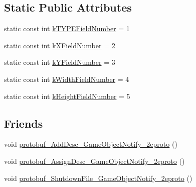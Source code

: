 \subsection*{Static Public Attributes}
\begin{DoxyCompactItemize}
\item 
static const int \hyperlink{class_game_object_notify_a1686fae6e717999f7a4a3c883336ae5d}{k\-T\-Y\-P\-E\-Field\-Number} = 1
\item 
static const int \hyperlink{class_game_object_notify_a433cdc06e51abce278f247ff3a046608}{k\-X\-Field\-Number} = 2
\item 
static const int \hyperlink{class_game_object_notify_a4750c0b42b3b9515597e0d6665245f56}{k\-Y\-Field\-Number} = 3
\item 
static const int \hyperlink{class_game_object_notify_a5462ed3aee65d02ae60fe9a2de05a849}{k\-Width\-Field\-Number} = 4
\item 
static const int \hyperlink{class_game_object_notify_a15142be03ab21831b8f54cd346a409a2}{k\-Height\-Field\-Number} = 5
\end{DoxyCompactItemize}
\subsection*{Friends}
\begin{DoxyCompactItemize}
\item 
void \hyperlink{class_game_object_notify_ad39fab9cb60a70367567c18bd3667614}{protobuf\-\_\-\-Add\-Desc\-\_\-\-Game\-Object\-Notify\-\_\-2eproto} ()
\item 
void \hyperlink{class_game_object_notify_abfcb28a9131368bf7de1e6967278aeb4}{protobuf\-\_\-\-Assign\-Desc\-\_\-\-Game\-Object\-Notify\-\_\-2eproto} ()
\item 
void \hyperlink{class_game_object_notify_a849952bd288bb23b66755e3f6fb3f8b6}{protobuf\-\_\-\-Shutdown\-File\-\_\-\-Game\-Object\-Notify\-\_\-2eproto} ()
\end{DoxyCompactItemize}


